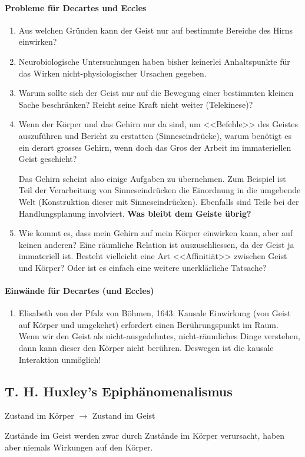 \documentclass[../main.tex]{subfiles}
\begin{document}
\paragraph{Probleme für Decartes und Eccles} 
\begin{enumerate}
	\item Aus welchen Gründen kann der Geist nur auf bestimmte Bereiche des Hirns einwirken?
	\item Neurobiologische Untersuchungen haben bisher keinerlei Anhaltspunkte für das Wirken nicht-physiologischer Ursachen gegeben. 
	\item Warum sollte sich der Geist nur auf die Bewegung einer bestimmten kleinen Sache beschränken? Reicht seine Kraft nicht weiter (Telekinese)?
	\item Wenn der Körper und das Gehirn nur da sind, um <<Befehle>> des Geistes auszuführen und Bericht zu erstatten (Sinneseindrücke), warum benötigt es ein derart grosses Gehirn, wenn doch das Gros der Arbeit im immateriellen Geist geschieht?

		Das Gehirn scheint also einige Aufgaben zu übernehmen. Zum Beispiel ist Teil der Verarbeitung von Sinneseindrücken die Einordnung in die umgebende Welt (Konstruktion dieser mit Sinneseindrücken). Ebenfalls sind Teile bei der Handlungsplanung involviert. \textbf{Was bleibt dem Geiste übrig?}
	\item Wie kommt es, dass mein Gehirn auf mein Körper einwirken kann, aber auf keinen anderen? Eine räumliche Relation ist auszuschliessen, da der Geist ja immateriell ist. Besteht vielleicht eine Art <<Affinitiät>> zwischen Geist und Körper? Oder ist es einfach eine weitere unerklärliche Tatsache?
	
\end{enumerate}
\paragraph{Einwände für Decartes (und Eccles)}
\begin{enumerate}
	\item Elisabeth von der Pfalz von Böhmen, 1643: Kausale Einwirkung (von Geist auf Körper und umgekehrt) erfordert einen Berührungspunkt im Raum. Wenn wir den Geist als nicht-ausgedehntes, nicht-räumliches Dinge verstehen, dann kann dieser den Körper nicht berühren. Deswegen ist die kausale Interaktion unmöglich!
\end{enumerate}

\subsection{T. H. Huxley's Epiphänomenalismus}
\begin{warningbox}
	Zustand im Körper $\longrightarrow$ Zustand im Geist
\end{warningbox}
Zustände im Geist werden zwar durch Zustände im Körper verursacht, haben aber niemals Wirkungen auf den Körper. 
\end{document}
